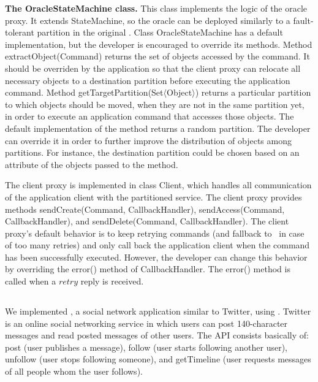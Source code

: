 \textbf{The OracleStateMachine class.} This class implements the logic of the oracle proxy. It extends StateMachine, so the oracle can be deployed similarly to a fault-tolerant partition in the original \ssmr{}. Class OracleStateMachine has a default implementation, but the developer is encouraged to override its methods. Method extractObject(Command) returns the set of objects accessed by the command. It should be overriden by the application so that the client proxy can relocate all necessary objects to a destination partition before executing the application command.
Method getTargetPartition(Set$\langle$Object$\rangle$) returns a particular partition to which objects should be moved, when they are not in the same partition yet, in order to execute an application command that accesses those objects. The default implementation of the method returns a random partition. The developer can override it in order to further improve the distribution of objects among partitions.
For instance, the destination partition could be chosen based on an attribute of the objects passed to the method.

The client proxy is implemented in class Client, which handles all communication of the application client with the partitioned service. The client proxy provides methods sendCreate(Command, CallbackHandler), sendAccess(Command, CallbackHandler), and sendDelete(Command, CallbackHandler). The client proxy's default behavior is to keep retrying commands (and fallback to \dssmr\ in case of too many retries) and only call back the application client when the command has been successfully executed.
However, the developer can change this behavior by overriding the error() method of CallbackHandler. The error() method is called when a $retry$ reply is received.


\subsection{\appname}

We implemented \appname{}, a social network application similar to Twitter, using \libname{}. Twitter is an online social networking service in which users can post 140-character messages and read posted messages of other users. The API consists basically of: post (user publishes a message), follow (user starts following another user), unfollow (user stops following someone), and getTimeline (user requests messages of all people whom the user follows).

